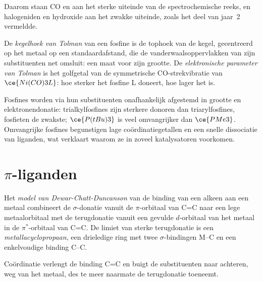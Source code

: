 Daarom staan CO en  aan het sterke uiteinde van de spectrochemische reeks, en
halogeniden en hydroxide aan het zwakke uiteinde, zoals het deel van
jaar~2 vermeldde.

\begin{definition}\label{def:b3:organometallic-bonding:tolman}
De \emph{kegelhoek van Tolman} van een fosfine
is de tophoek van de kegel, gecentreerd op het metaal op een
standaardafstand, die de vanderwaalsoppervlakken van zijn substituenten
net omsluit: een maat voor zijn grootte.
De \emph{elektronische parameter van Tolman}
is het golfgetal van de symmetrische CO-strekvibratie van $\ce{Ni(CO)3L}$: hoe sterker het
fosfine L doneert, hoe lager het is.
\end{definition}

Fosfines worden via hun substituenten onafhankelijk afgestemd in grootte
en elektronendonatie: trialkylfosfines zijn sterkere donoren dan
triarylfosfines, fosfieten de zwakste; $\ce{P(tBu)3}$ is veel omvangrijker dan $\ce{PMe3}$. Omvangrijke fosfines begunstigen
lage coördinatiegetallen en een snelle dissociatie van liganden, wat
verklaart waarom ze in zoveel katalysatoren voorkomen.

\section{$\pi$-liganden}

\begin{definition}\label{def:b3:organometallic-bonding:dcd}
Het \emph{model van Dewar-Chatt-Duncanson} van
de binding van een alkeen aan een metaal combineert de $\sigma$-donatie vanuit de $\pi$-orbitaal van C=C
naar een lege metaalorbitaal met de terugdonatie vanuit een gevulde $d$-orbitaal van het metaal in
de $\pi^*$-orbitaal van C=C. De limiet van sterke terugdonatie is een
\emph{metallacyclopropaan}, een drieledige ring
met twee $\sigma$-bindingen M--C en een enkelvoudige binding C--C.
\end{definition}

\begin{proposition}\label{prop:b3:organometallic-bonding:dcd}
Coördinatie verlengt de binding C=C en buigt de substituenten naar
achteren, weg van het metaal, des te meer naarmate de terugdonatie
toeneemt.
\end{proposition}

